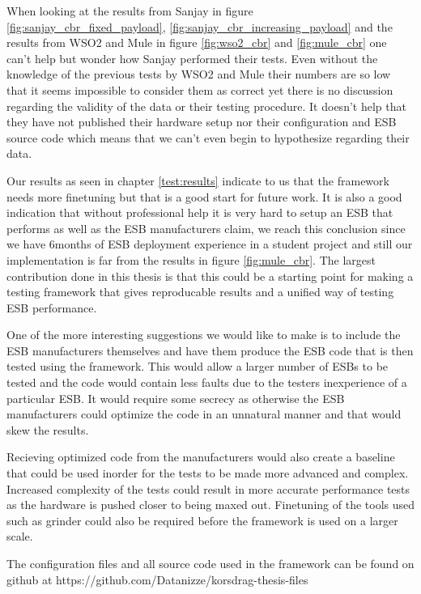 When looking at the results from Sanjay \cite{Sanjay2011} in figure \ref{fig:sanjay_cbr_fixed_payload}, \ref{fig:sanjay_cbr_increasing_payload} and the results from WSO2 and Mule \cite{Perera07R3,mulesoft08} in figure \ref{fig:wso2_cbr} and \ref{fig:mule_cbr} one can't help but wonder how Sanjay performed their tests.
Even without the knowledge of the previous tests by WSO2 and Mule their numbers are so low that it seems impossible to consider them as correct yet there is no discussion regarding the validity of the data or their testing procedure. 
It doesn't help that they have not published their hardware setup nor their configuration and ESB source code which means that we can't even begin to hypothesize regarding their data. 


Our results as seen in chapter \ref{test:results} indicate to us that the framework needs more finetuning but that is a good start for future work. 
It is also a good indication that without professional help it is very hard to setup an ESB that performs as well as the ESB manufacturers claim, we reach this conclusion since we have 6months of ESB deployment experience in a student project and still our implementation is far from the results in figure \ref{fig:mule_cbr}. 
The largest contribution done in this thesis is that this could be a starting point for making a testing framework that gives reproducable results and a unified way of testing ESB performance.


One of the more interesting suggestions we would like to make is to include the ESB manufacturers themselves and have them produce the ESB code that is then tested using the framework. 
This would allow a larger number of ESBs to be tested and the code would contain less faults due to the testers inexperience of a particular ESB. 
It would require some secrecy as otherwise the ESB manufacturers could optimize the code in an unnatural manner and that would skew the results.

Recieving optimized code from the manufacturers would also create a baseline that could be used inorder for the tests to be made more advanced and complex.
Increased complexity of the tests could result in more accurate performance tests as the hardware is pushed closer to being maxed out.
Finetuning of the tools used such as grinder could also be required before the framework is used on a larger scale.

The configuration files and all source code used in the framework can be found on github at https://github.com/Datanizze/korsdrag-thesis-files
